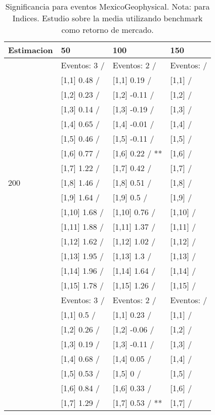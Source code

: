 \begin{table}

\caption{Significancia para eventos MexicoGeophysical. Nota: para Indices. Estudio sobre la media utilizando benchmark como retorno de mercado.}
\centering
\begin{tabular}[t]{llll}
\toprule
Estimacion & 50 & 100 & 150\\
\midrule
 & Eventos:  3 / & Eventos:  2 / & Eventos:   /\\
 & {}[1,1] 0.48  / & {}[1,1] 0.19  / & {}[1,1]  /\\
 & {}[1,2] 0.23  / & {}[1,2] -0.11  / & {}[1,2]  /\\
 & {}[1,3] 0.14  / & {}[1,3] -0.19  / & {}[1,3]  /\\
 & {}[1,4] 0.65  / & {}[1,4] -0.01  / & {}[1,4]  /\\
\addlinespace
 & {}[1,5] 0.46  / & {}[1,5] -0.11  / & {}[1,5]  /\\
 & {}[1,6] 0.77  / & {}[1,6] 0.22  / ** & {}[1,6]  /\\
 & {}[1,7] 1.22  / & {}[1,7] 0.42  / & {}[1,7]  /\\
200 & {}[1,8] 1.46  / & {}[1,8] 0.51  / & {}[1,8]  /\\
 & {}[1,9] 1.64  / & {}[1,9] 0.5  / & {}[1,9]  /\\
\addlinespace
 & {}[1,10] 1.68  / & {}[1,10] 0.76  / & {}[1,10]  /\\
 & {}[1,11] 1.88  / & {}[1,11] 1.37  / & {}[1,11]  /\\
 & {}[1,12] 1.62  / & {}[1,12] 1.02  / & {}[1,12]  /\\
 & {}[1,13] 1.95  / & {}[1,13] 1.3  / & {}[1,13]  /\\
 & {}[1,14] 1.96  / & {}[1,14] 1.64  / & {}[1,14]  /\\
\addlinespace
 & {}[1,15] 1.78  / & {}[1,15] 1.26  / & {}[1,15]  /\\
 & Eventos:  3 / & Eventos:  2 / & Eventos:   /\\
 & {}[1,1] 0.5  / & {}[1,1] 0.23  / & {}[1,1]  /\\
 & {}[1,2] 0.26  / & {}[1,2] -0.06  / & {}[1,2]  /\\
 & {}[1,3] 0.19  / & {}[1,3] -0.11  / & {}[1,3]  /\\
\addlinespace
 & {}[1,4] 0.68  / & {}[1,4] 0.05  / & {}[1,4]  /\\
 & {}[1,5] 0.53  / & {}[1,5] 0  / & {}[1,5]  /\\
 & {}[1,6] 0.84  / & {}[1,6] 0.33  / & {}[1,6]  /\\
 & {}[1,7] 1.29  / & {}[1,7] 0.53  / ** & {}[1,7]  /\\

\end{tabular}
\end{table}
